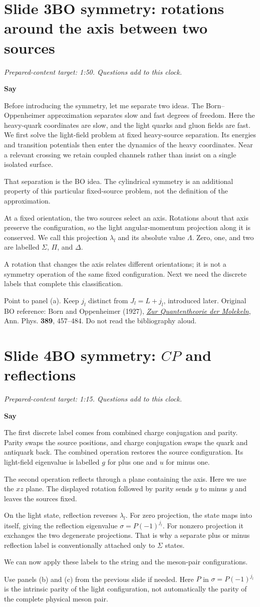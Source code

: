 \documentclass[11pt,a4paper]{article}
\newcommand{\cue}[1]{\begin{private}#1\end{private}}
\newenvironment{speech}{\par\textbf{Say}\par}{\par}
\newcommand{\slidenote}[3]{%
  \clearpage
  \pdfbookmark[1]{Slide #1}{slide-#1}%
  \section*{Slide #1\quad #2}
  \textit{Prepared-content target: #3. Questions add to this clock.}\par
}
\begin{document}
\slidenote{3}{BO symmetry: rotations around the axis between two sources}{1:50}
\begin{speech}
Before introducing the symmetry, let me separate two ideas. The
Born--Oppenheimer approximation separates slow and fast degrees of
freedom. Here the heavy-quark coordinates are slow, and the light quarks
and gluon fields are fast. We first solve the light-field problem at fixed
heavy-source separation. Its energies and transition potentials then enter
the dynamics of the heavy coordinates. Near a relevant crossing we retain
coupled channels rather than insist on a single isolated surface.

That separation is the BO idea. The cylindrical symmetry is an additional
property of this particular fixed-source problem, not the definition of
the approximation.

At a fixed orientation, the two sources select an axis. Rotations about
that axis preserve the configuration, so the light angular-momentum
projection along it is conserved. We call this projection $\lambda_l$ and
its absolute value $\Lambda$. Zero, one, and two are labelled $\Sigma$,
$\Pi$, and $\Delta$.

A rotation that changes the axis relates different orientations; it is
not a symmetry operation of the same fixed configuration. Next we need
the discrete labels that complete this classification.
\end{speech}
\cue{Point to panel (a). Keep $j_l$ distinct from $J_l=L+j_l$, introduced
later. Original BO reference: Born and Oppenheimer (1927),
\href{https://doi.org/10.1002/andp.19273892002}{\emph{Zur Quantentheorie der Molekeln}},
Ann. Phys. \textbf{389}, 457--484. Do not read the bibliography aloud.}

\slidenote{4}{BO symmetry: $CP$ and reflections}{1:15}
\begin{speech}
The first discrete label comes from combined charge conjugation and
parity. Parity swaps the source positions, and charge conjugation swaps
the quark and antiquark back. The combined operation restores the source
configuration. Its light-field eigenvalue is labelled $g$ for plus one
and $u$ for minus one.

The second operation reflects through a plane containing the axis. Here
we use the $xz$ plane. The displayed rotation followed by parity sends
$y$ to minus $y$ and leaves the sources fixed.

On the light state, reflection reverses $\lambda_l$. For zero projection,
the state maps into itself, giving the reflection eigenvalue
$\sigma=P(-1)^{j_l}$. For nonzero projection it exchanges the two
degenerate projections. That is why a separate plus or minus reflection
label is conventionally attached only to $\Sigma$ states.

We can now apply these labels to the string and the meson-pair configurations.
\end{speech}
\cue{Use panels (b) and (c) from the previous slide if needed. Here $P$ in
$\sigma=P(-1)^{j_l}$ is the intrinsic parity of the light configuration,
not automatically the parity of the complete physical meson pair.}
\end{document}
